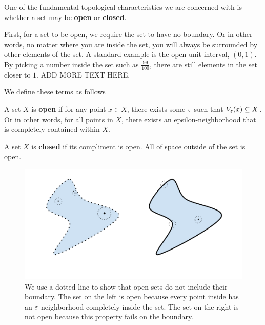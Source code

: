 \clearpage

One of the fundamental topological characteristics we are concerned with is whether a set may be \textbf{open} or \textbf{closed}. \par

First, for a set to be open, we require the set to have no boundary. Or in other words, no matter where you are inside the set, you will always be surrounded by other elements of the set. A standard example is the open unit interval, $(0,1)$. By picking a number inside the set such as $\frac{99}{100}$, there are still elements in the set closer to $1$.              ADD MORE TEXT HERE. \par

We define these terms as follows \par

\begin{definition}
A set $X$ is \textbf{open} if for any point $x\in X$, there exists some $\varepsilon$ such that $V_\varepsilon(x)\subseteq X$. Or in other words, for all points in $X$, there exists an epsilon-neighborhood that is completely contained within $X$.     
\end{definition}

\begin{definition}
A set $X$ is \textbf{closed} if its compliment is open. All of space outside of the set is open.     
\end{definition}

\begin{figure}[h]
    \centering
    \includegraphics[width=0.75\linewidth]{Images//Chap0/0.4.2.png}
    \caption{We use a dotted line to show that open sets do not include their boundary. The set on the left is open because every point inside has an $\varepsilon$-neighborhood completely inside the set. The set on the right is not open because this property fails on the boundary.}
\end{figure}

